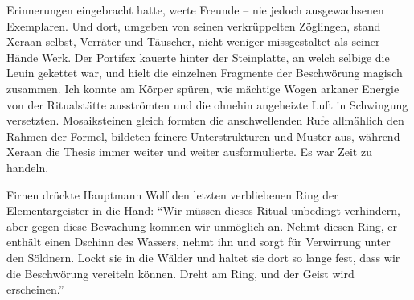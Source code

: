 Erinnerungen eingebracht hatte, werte Freunde -- nie jedoch ausgewachsenen Exemplaren. Und dort, umgeben von seinen verkrüppelten Zöglingen, stand Xeraan selbst, Verräter und Täuscher, nicht weniger missgestaltet als seiner Hände Werk. Der Portifex kauerte hinter der Steinplatte, an welch selbige die Leuin gekettet war, und hielt die einzelnen Fragmente der Beschwörung magisch zusammen. Ich konnte am Körper spüren, wie mächtige Wogen arkaner Energie von der Ritualstätte ausströmten und die ohnehin angeheizte Luft in Schwingung versetzten. Mosaiksteinen gleich formten die anschwellenden Rufe allmählich den Rahmen der Formel, bildeten feinere Unterstrukturen und Muster aus, während Xeraan die Thesis immer weiter und weiter ausformulierte. Es war Zeit zu handeln.

Firnen drückte Hauptmann Wolf den letzten verbliebenen Ring der Elementargeister in die Hand: ``Wir müssen dieses Ritual unbedingt verhindern, aber gegen diese Bewachung kommen wir unmöglich an. Nehmt diesen Ring, er enthält einen Dschinn des Wassers, nehmt ihn und sorgt für Verwirrung unter den Söldnern. Lockt sie in die Wälder und haltet sie dort so lange fest, dass wir die Beschwörung vereiteln können. Dreht am Ring, und der Geist wird erscheinen.''

